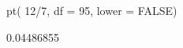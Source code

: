 \begin{Schunk}
\begin{Sinput}
 pt( 12/7, df = 95, lower = FALSE)
\end{Sinput}
\begin{Soutput}
[1] 0.04486855
\end{Soutput}
\end{Schunk}
